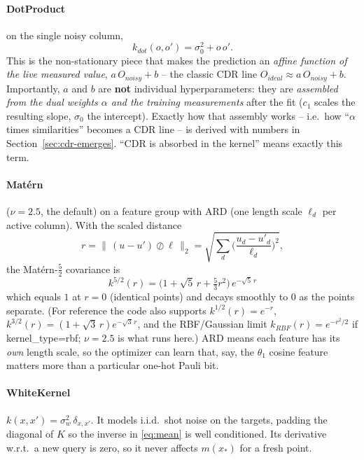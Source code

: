 \documentclass[11pt]{article}
\def\bm#1{#1}%
\def\texttt#1{#1}%
\def\mathrm#1{#1}%
\begin{document}
\paragraph{DotProduct} on the single noisy column,
\begin{equation}
k_{\mathrm{dot}}(o,o')=\sigma_0^2+o\,o'.
\end{equation}
This is the non-stationary piece that makes the prediction an \emph{affine
function of the live measured value}, $a\,O_{\mathrm{noisy}}+b$ -- the classic CDR
line $O_{\mathrm{ideal}}\approx a\,O_{\mathrm{noisy}}+b$. Importantly, $a$ and $b$
are \textbf{not} individual hyperparameters: they are \emph{assembled from the dual
weights $\bm\alpha$ and the training measurements} after the fit ($c_1$ scales the
resulting slope, $\sigma_0$ the intercept). Exactly how that assembly works --
i.e.\ how ``$\bm\alpha$ times similarities'' becomes a CDR line -- is derived with
numbers in Section~\ref{sec:cdr-emerges}. ``CDR is absorbed in the kernel'' means
exactly this term.

\paragraph{Mat\'ern} ($\nu=2.5$, the default) on a feature group with ARD
(one length scale $\ell_d$ per active column). With the scaled distance
\begin{equation}
r=\Big\|\,(\bm u-\bm u')\oslash\bm\ell\,\Big\|_2
=\sqrt{\sum_{d}\Big(\frac{u_d-u'_d}{\ell_d}\Big)^2},
\label{eq:rdist}
\end{equation}
the Mat\'ern-$\tfrac52$ covariance is
\begin{equation}
\boxed{\;k^{5/2}(r)=\Big(1+\sqrt5\,r+\tfrac{5}{3}r^2\Big)\,e^{-\sqrt5\,r}\;}
\label{eq:matern25}
\end{equation}
which equals $1$ at $r=0$ (identical points) and decays smoothly to $0$ as the
points separate. (For reference the code also supports
$k^{1/2}(r)=e^{-r}$, $k^{3/2}(r)=(1+\sqrt3\,r)e^{-\sqrt3\,r}$, and the
RBF/Gaussian limit $k_{\mathrm{RBF}}(r)=e^{-r^2/2}$ if \texttt{kernel\_type=rbf};
$\nu=2.5$ is what runs here.) ARD means each feature has its \emph{own}
length scale, so the optimizer can learn that, say, the $\theta_1$ cosine feature
matters more than a particular one-hot Pauli bit.

\paragraph{WhiteKernel} $k(\bm x,\bm x')=\sigma_w^2\,\delta_{\bm x,\bm x'}$. It
models i.i.d.\ shot noise on the targets, padding the diagonal of $K$ so the
inverse in \eqref{eq:mean} is well conditioned. Its derivative w.r.t.\ a new
query is zero, so it never affects $m(\bm x_*)$ for a fresh point.
\end{document}
